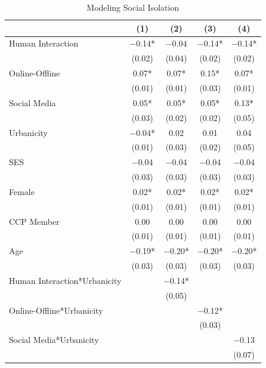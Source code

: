 \documentclass[]{interact}
\theoremstyle{plain}%
\theoremstyle{definition}
\theoremstyle{remark}
\begin{document}
\hypertarget{tbl-social-isolation-models}{}
\begin{table}
\caption{\label{tbl-social-isolation-models}Modeling Social Isolation }\tabularnewline

\centering
\begin{threeparttable}
\begin{tabular}[t]{lcccc}
\toprule
  & (1) & (2) & (3) & (4)\\
\midrule
Human Interaction & \num{-0.14}* & \num{-0.04} & \num{-0.14}* & \num{-0.14}*\\
 & (\num{0.02}) & (\num{0.04}) & (\num{0.02}) & (\num{0.02})\\
Online-Offline & \num{0.07}* & \num{0.07}* & \num{0.15}* & \num{0.07}*\\
 & (\num{0.01}) & (\num{0.01}) & (\num{0.03}) & (\num{0.01})\\
Social Media & \num{0.05}* & \num{0.05}* & \num{0.05}* & \num{0.13}*\\
 & (\num{0.03}) & (\num{0.02}) & (\num{0.02}) & (\num{0.05})\\
Urbanicity & \num{-0.04}* & \num{0.02} & \num{0.01} & \num{0.04}\\
 & (\num{0.01}) & (\num{0.03}) & (\num{0.02}) & (\num{0.05})\\
SES & \num{-0.04} & \num{-0.04} & \num{-0.04} & \num{-0.04}\\
 & (\num{0.03}) & (\num{0.03}) & (\num{0.03}) & \vphantom{1} (\num{0.03})\\
Female & \num{0.02}* & \num{0.02}* & \num{0.02}* & \num{0.02}*\\
 & (\num{0.01}) & (\num{0.01}) & (\num{0.01}) & \vphantom{1} (\num{0.01})\\
CCP Member & \num{0.00} & \num{0.00} & \num{0.00} & \num{0.00}\\
 & (\num{0.01}) & (\num{0.01}) & (\num{0.01}) & (\num{0.01})\\
Age & \num{-0.19}* & \num{-0.20}* & \num{-0.20}* & \num{-0.20}*\\
 & (\num{0.03}) & (\num{0.03}) & (\num{0.03}) & (\num{0.03})\\
Human Interaction*Urbanicity &  & \num{-0.14}* &  & \\
 &  & (\num{0.05}) &  & \\
Online-Offline*Urbanicity &  &  & \num{-0.12}* & \\
 &  &  & (\num{0.03}) & \\
Social Media*Urbanicity &  &  &  & \num{-0.13}\\
 &  &  &  & (\num{0.07})\\

\end{tabular}
\end{threeparttable}
\end{table}
\end{document}
